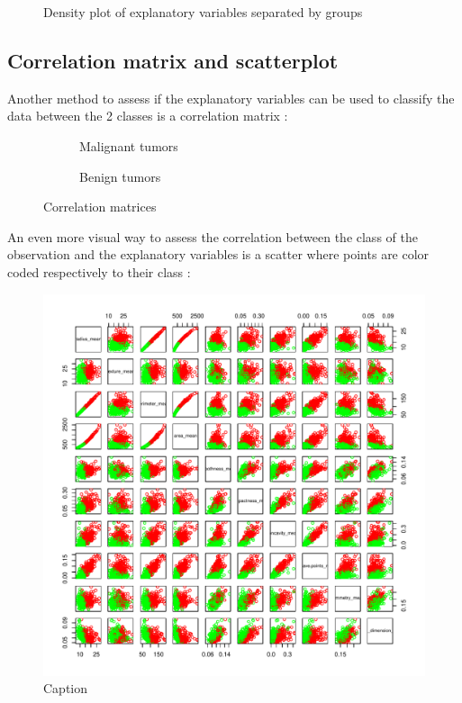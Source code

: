 \begin{figure}[H]
    \centering
    
    \caption{Density plot of explanatory variables separated by groups}
    \label{fig:q1_density}
\end{figure}

\newpage
\subsection{Correlation matrix and scatterplot}
Another method to assess if the explanatory variables can be used to classify the data between the 2 classes is a correlation matrix : 

\begin{figure}[H]
\centering
\begin{subfigure}{.5\textwidth}
  \centering
  
  \caption{Malignant tumors}
\end{subfigure}%
\begin{subfigure}{.5\textwidth}
  \centering
  
  \caption{Benign tumors}
\end{subfigure}
\caption{Correlation matrices}
\end{figure}

An even more visual way to assess the correlation between the class of the observation and the explanatory variables is a scatter where points are color coded respectively to their class :

\begin{figure}[H]
    \centering
    \includegraphics[width=.55\textwidth]{figs/q1_pairs.pdf}
    \caption{Caption}
    \label{fig:scatterplot}
\end{figure}

